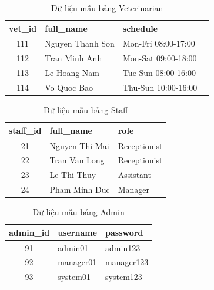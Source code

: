 \begin{table}[htbp]
    \centering
    \caption{Dữ liệu mẫu bảng Veterinarian}
    \label{tab:data_veterinarian}
    \begin{tabular}{|c|l|l|l|}
        \hline
        \textbf{vet\_id} & \textbf{full\_name} & \textbf{schedule} \\ \hline

        111 & Nguyen Thanh Son & Mon-Fri 08:00-17:00 \\ \hline
        112 & Tran Minh Anh & Mon-Sat 09:00-18:00 \\ \hline
        113 & Le Hoang Nam & Tue-Sun 08:00-16:00 \\ \hline
        114 & Vo Quoc Bao & Thu-Sun 10:00-16:00 \\ \hline

    \end{tabular}
\end{table}


\begin{table}[htbp]
    \centering
    \caption{Dữ liệu mẫu bảng Staff}
    \label{tab:data_staff}
    \begin{tabular}{|c|l|l|}
        \hline
        \textbf{staff\_id} & \textbf{full\_name} & \textbf{role} \\ \hline

        21 & Nguyen Thi Mai & Receptionist \\ \hline
        22 & Tran Van Long & Receptionist \\ \hline
        23 & Le Thi Thuy & Assistant \\ \hline
        24 & Pham Minh Duc & Manager \\ \hline

    \end{tabular}
\end{table}


\begin{table}[htbp]
    \centering
    \caption{Dữ liệu mẫu bảng Admin}
    \label{tab:data_admin}
    \begin{tabular}{|c|l|l|}
        \hline
        \textbf{admin\_id} & \textbf{username} & \textbf{password} \\ \hline

        91 & admin01 & admin123 \\ \hline
        92 & manager01 & manager123 \\ \hline
        93 & system01 & system123 \\ \hline

    \end{tabular}
\end{table}


